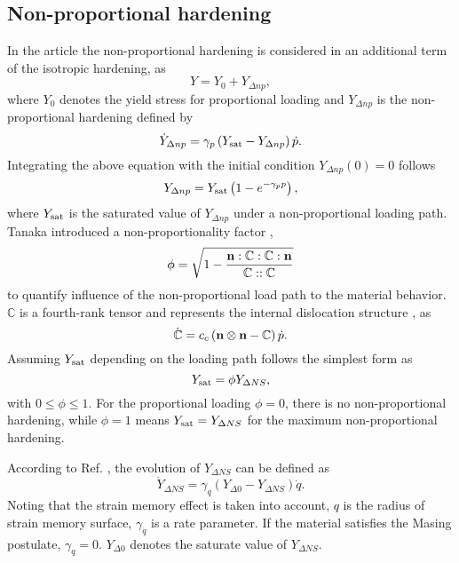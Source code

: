 \documentclass[preprint,5p,twocolumn,11pt,sort&compress]{elsarticle}
\newcommand{\bfn}{{\bf n}}
\begin{document}
\subsection{Non-proportional hardening}
\noindent
In the article the non-proportional hardening is considered in an additional term of the isotropic hardening, as
\begin{equation}
Y = {Y_0} + {Y_{\Delta np}},
\end{equation}
where $Y_0$ denotes the yield stress for proportional loading and ${Y_{\Delta np}}$ is the non-proportional hardening defined by
\begin{equation}
{\dot Y_{\Delta np}} = {\gamma _p}\left( {{Y_{\rm sat}} - {Y_{\Delta np}}} \right)\dot p.
\end{equation}
Integrating the above equation with the initial condition ${Y_{\Delta np}}(0)=0$ follows
\begin{equation}
{Y_{\Delta np}} = Y_{\rm sat}\left( 1-e^{- \gamma_p p} \right),
\end{equation}
where $Y_{\rm sat}$ is the saturated value of ${Y_{\Delta np}}$ under a non-proportional loading path.
Tanaka introduced a non-proportionality factor \cite{tanaka1994nonproportionality},
\begin{equation}
\phi  = \sqrt {1 - \frac{{\bfn:\mathbb{C}:\mathbb{C}:\bfn}}{{\mathbb{C}::\mathbb{C}}}}
\end{equation}
to quantify influence of the non-proportional load path to the material behavior.  $\mathbb{C}$ is a fourth-rank tensor and represents the internal dislocation structure \cite{tanaka1994nonproportionality}, as
\begin{equation}
\dot {\mathbb{C}} = {c_c}\left( {\bfn \otimes \bfn - \mathbb{C}} \right)\dot p.
\end{equation}
Assuming ${Y_{\rm sat}}$ depending on the loading path follows the simplest form as
\begin{equation}
{Y_{\rm sat}} = \phi {Y_{\Delta NS}},
\end{equation}
with $0 \leq \phi \leq 1$.
For the proportional loading $\phi = 0$, there is no non-proportional hardening, while $\phi = 1$ means ${Y_{\rm sat}} = {Y_{\Delta NS}}$ for the maximum non-proportional hardening.

According to Ref. \cite{fang2015cyclic}, the evolution of ${Y_{\Delta NS}}$ can be defined as
\begin{equation}
{\dot Y_{\Delta NS}} = {\gamma _q}\left( {{Y_{\Delta 0}} - {Y_{\Delta NS}}} \right)\dot q.
\end{equation}
Noting that the strain memory effect is taken into account, $q$ is the radius of strain memory surface, ${\gamma _q}$ is a rate parameter.
If the material satisfies the Masing postulate,  ${\gamma _q}=0$. $Y_{\Delta 0} $ denotes the saturate value of $Y_{\Delta NS}$.
\end{document}
